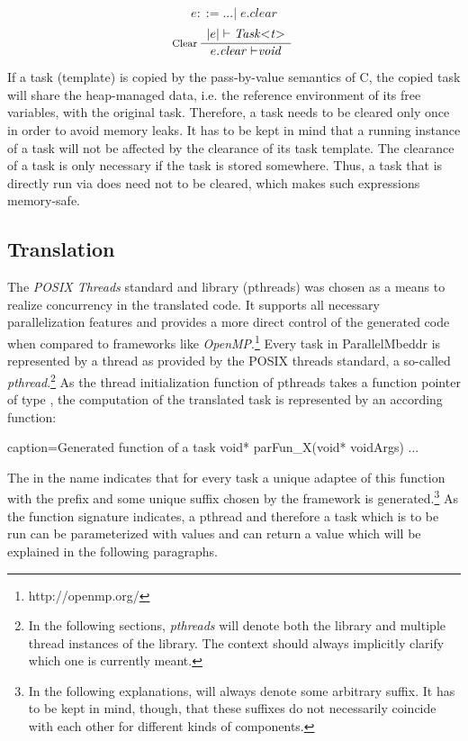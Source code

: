 \begin{equation}
e ::= ...|\;e.\mathit{clear}
\end{equation}
\begin{equation}
\inference*[Clear]{|e| |- \mathit{Task{<}t{>}}}{e.\mathit{clear |-} \mathit{void}} 
\end{equation}

If a task (template) is copied by the pass-by-value semantics of C, the copied task will share the heap-managed data, i.e. the reference environment of its free variables, with the original task. Therefore, a task needs to be cleared only once in order to avoid memory leaks. It has to be kept in mind that a running instance of a task will not be affected by the clearance of its task template. The clearance of a task is only necessary if the task is stored somewhere. Thus, a task that is directly run via  does need not to be cleared, which makes such expressions memory-safe.

\subsection{Translation}
\label{tasksTranslation}
The \textit{POSIX Threads} standard and library (pthreads) was chosen as a means to realize concurrency in the translated code. It supports all necessary parallelization features and provides a more direct control of the generated code when compared to frameworks like \textit{OpenMP}.\footnote{http://openmp.org/} Every task in ParallelMbeddr is represented by a thread as provided by the POSIX threads standard, a so-called \textit{pthread}.\footnote{In the following sections, \textit{pthreads} will denote both the library and multiple thread instances of the library. The context should always implicitly clarify which one is currently meant.} As the thread initialization function of pthreads takes a function pointer of type , the computation of the translated task is represented by an according function:

\begin{ccode}{caption=Generated function of a task}
void* parFun_X(void* voidArgs) {...}
\end{ccode}

The  in the name indicates that for every task a unique adaptee of this function with the prefix  and some unique suffix chosen by the framework is generated.\footnote{In the following explanations,  will always denote some arbitrary suffix. It has to be kept in mind, though, that these suffixes do not necessarily coincide with each other for different kinds of components.} As the function signature indicates, a pthread and therefore a task which is to be run can be parameterized with values and can return a value which will be explained in the following paragraphs.

